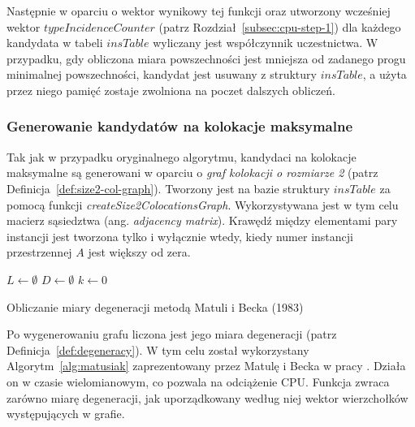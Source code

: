 \documentclass[12pt]{article}
\begin{document}
Następnie w oparciu o wektor wynikowy tej funkcji oraz utworzony wcześniej wektor $ typeIncidenceCounter$ (patrz Rozdział~\ref{subsec:cpu-step-1}) dla każdego kandydata w tabeli $ insTable $ wyliczany jest współczynnik uczestnictwa. W przypadku, gdy obliczona miara powszechności jest mniejsza od zadanego progu minimalnej powszechności, kandydat jest usuwany z struktury $ insTable $, a użyta przez niego pamięć zostaje zwolniona na poczet dalszych obliczeń.

\subsubsection{Generowanie kandydatów na kolokacje maksymalne}
\label{subsec:kerbosz}

Tak jak w przypadku oryginalnego algorytmu, kandydaci na kolokacje maksymalne są generowani w oparciu o \textit{graf kolokacji o rozmiarze 2} (patrz Definicja~\ref{def:size2-col-graph}). Tworzony jest na bazie struktury $ insTable $ za pomocą funkcji \textit{createSize2ColocationsGraph}. Wykorzystywana jest w tym celu macierz sąsiedztwa (ang. \textit{adjacency matrix}). Krawędź między elementami pary instancji jest tworzona tylko i wyłącznie wtedy, kiedy numer instancji przestrzennej $ A $ jest większy od zera. 

\begin{algorithm}
$L \leftarrow \emptyset$\; 
$D \leftarrow \emptyset$\;
$k \leftarrow 0$\;
\caption{Obliczanie miary degeneracji metodą Matuli i Becka (1983)}
\label{alg:matusiak}
\end{algorithm}

Po wygenerowaniu grafu liczona jest jego miara degeneracji (patrz Definicja~\ref{def:degeneracy}). W tym celu został wykorzystany Algorytm~\ref{alg:matusiak} zaprezentowany przez Matulę i Becka w pracy \cite{matusiak}. Działa on w czasie wielomianowym, co pozwala na odciążenie CPU. Funkcja zwraca zarówno miarę degeneracji, jak uporządkowany według niej wektor wierzchołków występujących w grafie.
\end{document}
